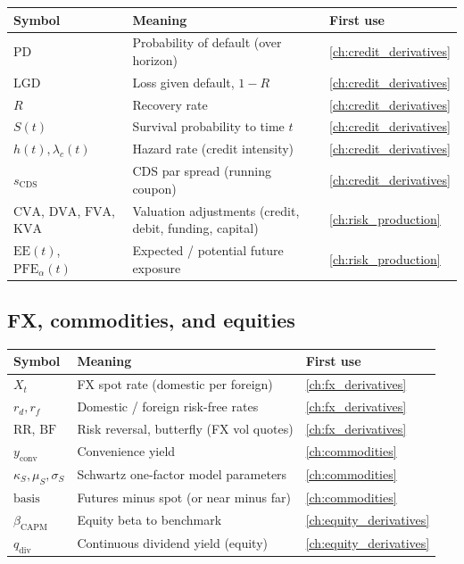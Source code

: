 \begin{longtable}{@{}l >{\raggedright\arraybackslash}p{} l@{}}
\toprule
\textbf{Symbol} & \textbf{Meaning} & \textbf{First use} \\
\midrule
\endhead
$\text{PD}$ & Probability of default (over horizon) & \cref{ch:credit_derivatives} \\
$\text{LGD}$ & Loss given default, $1 - R$ & \cref{ch:credit_derivatives} \\
$R$ & Recovery rate & \cref{ch:credit_derivatives} \\
$S(t)$ & Survival probability to time $t$ & \cref{ch:credit_derivatives} \\
$h(t), \lambda_c(t)$ & Hazard rate (credit intensity) & \cref{ch:credit_derivatives} \\
$s_{\text{CDS}}$ & CDS par spread (running coupon) & \cref{ch:credit_derivatives} \\
$\text{CVA}$, $\text{DVA}$, $\text{FVA}$, $\text{KVA}$ & Valuation adjustments (credit, debit, funding, capital) & \cref{ch:risk_production} \\
$\text{EE}(t)$, $\text{PFE}_\alpha(t)$ & Expected / potential future exposure & \cref{ch:risk_production} \\
\bottomrule
\end{longtable}

\subsection{FX, commodities, and equities}

\begin{longtable}{@{}l >{\raggedright\arraybackslash}p{} l@{}}
\toprule
\textbf{Symbol} & \textbf{Meaning} & \textbf{First use} \\
\midrule
\endhead
$X_t$ & FX spot rate (domestic per foreign) & \cref{ch:fx_derivatives} \\
$r_d, r_f$ & Domestic / foreign risk-free rates & \cref{ch:fx_derivatives} \\
$\text{RR}$, $\text{BF}$ & Risk reversal, butterfly (FX vol quotes) & \cref{ch:fx_derivatives} \\
$y_{\text{conv}}$ & Convenience yield & \cref{ch:commodities} \\
$\kappa_S, \mu_S, \sigma_S$ & Schwartz one-factor model parameters & \cref{ch:commodities} \\
$\text{basis}$ & Futures minus spot (or near minus far) & \cref{ch:commodities} \\
$\beta_{\text{CAPM}}$ & Equity beta to benchmark & \cref{ch:equity_derivatives} \\
$q_{\text{div}}$ & Continuous dividend yield (equity) & \cref{ch:equity_derivatives} \\
\bottomrule
\end{longtable}

